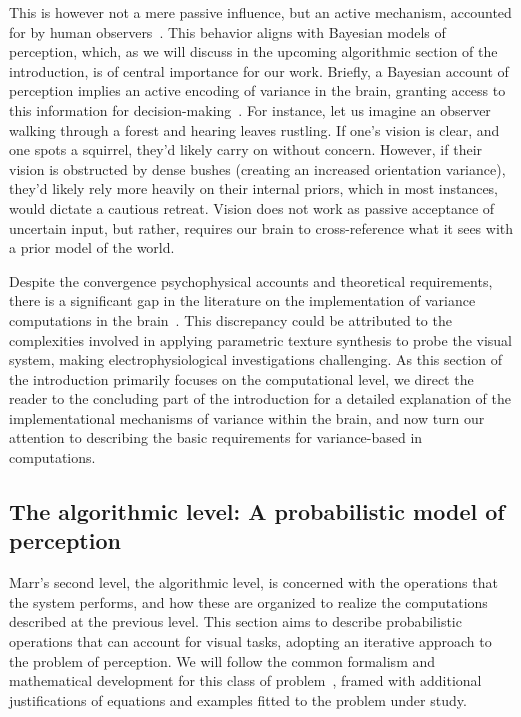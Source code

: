 This is however not a mere passive influence, but an active mechanism, accounted for by human observers~\cite{barthelme2009evaluation}. This behavior aligns with Bayesian models of perception, which, as we will discuss in the upcoming algorithmic section of the introduction, is of central importance for our work. Briefly, a Bayesian account of perception implies an active encoding of variance in the brain, granting access to this information for decision-making~\cite{geurts2022subjective}. For instance, let us imagine an observer walking through a forest and hearing leaves rustling. If one's vision is clear, and one spots a squirrel, they'd likely carry on without concern. However, if their vision is obstructed by dense bushes (creating an increased orientation variance), they'd likely rely more heavily on their internal priors, which in most instances, would dictate a cautious retreat. Vision does not work as passive acceptance of uncertain input, but rather, requires our brain to cross-reference what it sees with a prior model of the world.

Despite the convergence psychophysical accounts and theoretical requirements, there is a significant gap in the literature on the implementation of variance computations in the brain~\cite{koblinger2021representations}. This discrepancy could be attributed to the complexities involved in applying parametric texture synthesis to probe the visual system, making electrophysiological investigations challenging. As this section of the introduction primarily focuses on the computational level, we direct the reader to the concluding part of the introduction for a detailed explanation of the implementational mechanisms of variance within the brain, and now turn our attention to describing the basic requirements for variance-based in computations.



\newpage 



\subsection{The algorithmic level: A probabilistic model of perception}
Marr's second level, the algorithmic level, is concerned with the operations that the system performs, and how these are organized to realize the computations described at the previous level. This section aims to describe probabilistic operations that can account for visual tasks, adopting an iterative approach to the problem of perception. We will follow the common formalism and mathematical development for this class of problem~\cite{bogacz2017tutorial}, framed with additional justifications of equations and examples fitted to the problem under study.

